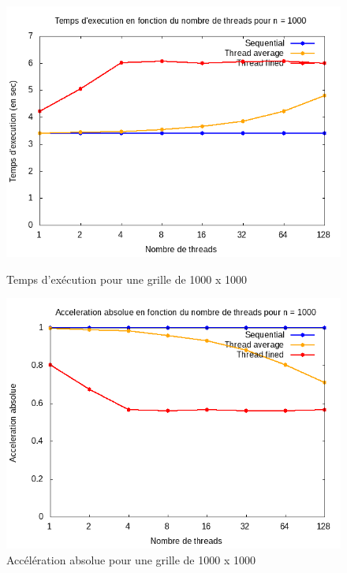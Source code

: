 \documentclass[10pt,a4paper]{article}
\begin{document}
\begin{figure}[!tbp]
  \centering
  \begin{minipage}[b]{0.49\textwidth}
	\includegraphics[width=\textwidth]{./Time/size_1000_time.png}
    \caption{Temps d'exécution pour une grille de 1000 x 1000}
  \end{minipage}
  \hfill
  \begin{minipage}[b]{0.49\textwidth}
    \includegraphics[width=\textwidth]{./Time/size_1000_acceleration.png}
    \caption{Accélération absolue pour une grille de 1000 x 1000}
  \end{minipage}
\end{figure}
\end{document}

